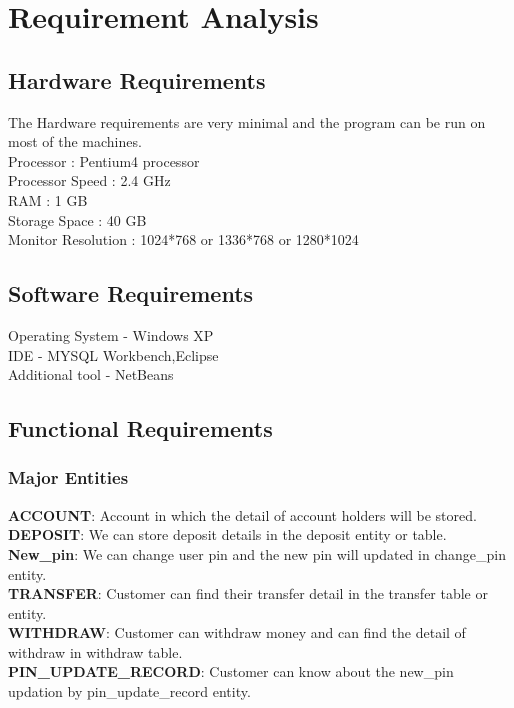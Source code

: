\chapter{Requirement Analysis}

\section{Hardware Requirements}
The Hardware requirements are very minimal and the program can be run on most of
the machines. \\
Processor : Pentium4 processor\\
Processor Speed : 2.4 GHz\\
RAM : 1 GB\\
Storage Space : 40 GB\\
Monitor Resolution : 1024*768 or 1336*768 or 1280*1024\\
\thispagestyle{fancy}

\section{Software Requirements}
Operating System - Windows XP\\
IDE - MYSQL Workbench,Eclipse\\
Additional tool - NetBeans\\
\thispagestyle{fancy}

\section{Functional Requirements}
\subsection{Major Entities}
\textbf{ACCOUNT}: Account in which the detail of account holders will be stored.\\
\textbf{DEPOSIT}: We can store deposit details in the deposit entity or table.\\
\textbf{New\_pin}: We can change user pin and the new pin will updated in change\_pin entity.\\
\textbf{TRANSFER}: Customer can find their transfer detail in the transfer table or entity.\\
\textbf{WITHDRAW}: Customer can withdraw money and can find the detail of withdraw in withdraw table.\\
\textbf{PIN\_UPDATE\_RECORD}: Customer can know about the new\_pin updation by
pin\_update\_record entity.\\
\thispagestyle{fancy}

